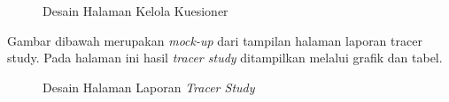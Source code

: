 \begin{figure}[H]
	\centering
	\caption{Desain Halaman Kelola Kuesioner}
	\label{admin_kelolakuesioner}
\end{figure}

Gambar dibawah merupakan \textit{mock-up} dari tampilan halaman laporan tracer study. Pada halaman ini hasil \textit{tracer study} ditampilkan melalui grafik dan tabel.

\begin{figure}[H]
	\centering
	\caption{Desain Halaman Laporan \textit{Tracer Study}}
	\label{admin_kelolakuesioner}
\end{figure}

